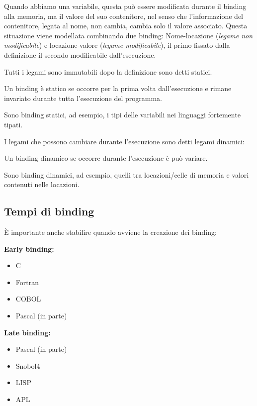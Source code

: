 \documentclass[oneside,a4paper,11pt]{book}
\theoremstyle{italicstyle}
\theoremstyle{normStyle}
\begin{document}
Quando abbiamo una variabile, questa può essere modificata durante 
il binding alla memoria, ma il valore del suo contenitore, nel senso che l'informazione 
del contenitore, legata al nome, non cambia, cambia solo il valore associato.
Questa situazione viene modellata combinando due binding: Nome-locazione (\textit{legame non modificabile}) e 
locazione-valore (\textit{legame modificabile}), il primo fissato dalla 
definizione il secondo modificabile dall'esecuzione.

Tutti i legami sono immutabili dopo la definizione sono detti statici.
\begin{tcolorbox}[title = {Binding statico}]
  Un binding è statico se occorre per la prima volta dall'esecuzione e 
  rimane invariato durante tutta l'esecuzione del programma.
\end{tcolorbox}
Sono binding statici, ad esempio, i tipi delle variabili nei linguaggi fortemente tipati.

I legami che possono cambiare durante l'esecuzione sono detti legami dinamici:
\begin{tcolorbox}[title = {Binding dinamico}]
  Un binding dinamico se occorre durante l'esecuzione è può variare.
\end{tcolorbox}
Sono binding dinamici, ad esempio, quelli tra locazioni/celle di memoria e valori 
contenuti nelle locazioni.
\subsection{Tempi di binding}
È importante anche stabilire quando avviene la creazione dei binding:

\begin{minipage}[t]{0.45\textwidth}
  \textbf{Early binding:}
  
  \begin{itemize}
      \item C
      \item Fortran
      \item COBOL
      \item Pascal (in parte)
  \end{itemize}
  
  \end{minipage}\hfill
  \begin{minipage}[t]{0.45\textwidth}
  \textbf{Late binding:}
  
  \begin{itemize}
      \item Pascal (in parte)
      \item Snobol4
      \item LISP
      \item APL
  \end{itemize}
\end{minipage}  
\end{document}
